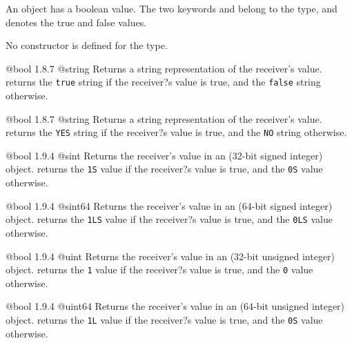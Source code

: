 
An  object has a boolean value. The two keywords  and  belong to the  type, and denotes the true and false values.

No constructor is defined for the  type.

{@bool}
{1.8.7}
{@string}
{Returns a string representation of the receiver's value.}
{returns the \texttt{\textquotedbl true\textquotedbl} string if the receiver?s value is true, and the \texttt{\textquotedbl false\textquotedbl} string otherwise.}







{@bool}
{1.8.7}
{@string}
{Returns a string representation of the receiver's value.}
{returns the \texttt{\textquotedbl YES\textquotedbl} string if the receiver?s value is true, and the \texttt{\textquotedbl NO\textquotedbl} string otherwise.}




{@bool}
{1.9.4}
{@sint}
{Returns the receiver's value in an  (32-bit signed integer) object.}
{returns the \texttt{1S}  value if the receiver?s value is true, and the \texttt{0S}  value otherwise.}




{@bool}
{1.9.4}
{@sint64}
{Returns the receiver's value in an  (64-bit signed integer) object.}
{returns the \texttt{1LS}  value if the receiver?s value is true, and the \texttt{0LS}  value otherwise.}




{@bool}
{1.9.4}
{@uint}
{Returns the receiver's value in an  (32-bit unsigned integer) object.}
{returns the \texttt{1}  value if the receiver?s value is true, and the \texttt{0}  value otherwise.}




{@bool}
{1.9.4}
{@uint64}
{Returns the receiver's value in an  (64-bit unsigned integer) object.}
{returns the \texttt{1L}  value if the receiver?s value is true, and the \texttt{0S}  value otherwise.}




